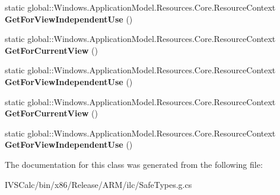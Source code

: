 \begin{DoxyCompactItemize}
static global\+::\+Windows.\+Application\+Model.\+Resources.\+Core.\+Resource\+Context {\bfseries Get\+For\+View\+Independent\+Use} ()
\item 
\mbox{\label{class_windows_1_1_application_model_1_1_resources_1_1_core_1_1_resource_context_aa88e2dab7f50d766e021aa2285842ab4}} 
static global\+::\+Windows.\+Application\+Model.\+Resources.\+Core.\+Resource\+Context {\bfseries Get\+For\+Current\+View} ()
\item 
\mbox{\label{class_windows_1_1_application_model_1_1_resources_1_1_core_1_1_resource_context_a8c7c08decba86df5cca25a8d940e9c44}} 
static global\+::\+Windows.\+Application\+Model.\+Resources.\+Core.\+Resource\+Context {\bfseries Get\+For\+View\+Independent\+Use} ()
\item 
\mbox{\label{class_windows_1_1_application_model_1_1_resources_1_1_core_1_1_resource_context_aa88e2dab7f50d766e021aa2285842ab4}} 
static global\+::\+Windows.\+Application\+Model.\+Resources.\+Core.\+Resource\+Context {\bfseries Get\+For\+Current\+View} ()
\item 
\mbox{\label{class_windows_1_1_application_model_1_1_resources_1_1_core_1_1_resource_context_a8c7c08decba86df5cca25a8d940e9c44}} 
static global\+::\+Windows.\+Application\+Model.\+Resources.\+Core.\+Resource\+Context {\bfseries Get\+For\+View\+Independent\+Use} ()
\end{DoxyCompactItemize}


The documentation for this class was generated from the following file\+:\begin{DoxyCompactItemize}
\item 
I\+V\+S\+Calc/bin/x86/\+Release/\+A\+R\+M/ilc/Safe\+Types.\+g.\+cs\end{DoxyCompactItemize}
